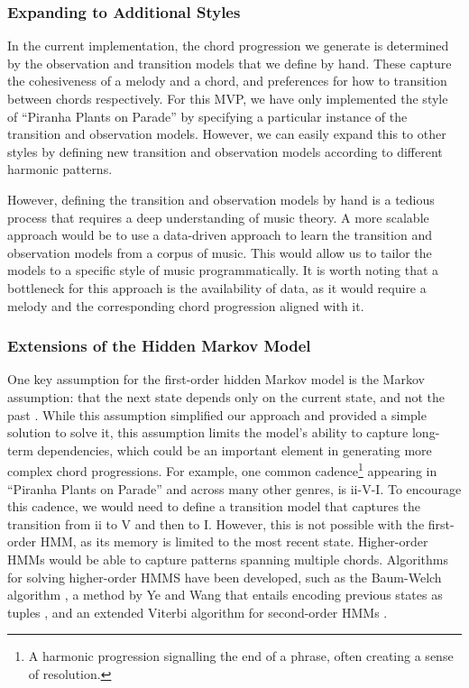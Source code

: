 \subsubsection{Expanding to Additional Styles}

In the current implementation, the chord progression we generate is determined by the observation and transition models that we define by hand. These capture the cohesiveness of a melody and a chord, and preferences for how to transition between chords respectively. For this MVP, we have only implemented the style of ``Piranha Plants on Parade'' by specifying a particular instance of the transition and observation models. However, we can easily expand this to other styles by defining new transition and observation models according to different harmonic patterns.

However, defining the transition and observation models by hand is a tedious process that requires a deep understanding of music theory. A more scalable approach would be to use a data-driven approach to learn the transition and observation models from a corpus of music. This would allow us to tailor the models to a specific style of music programmatically. It is worth noting that a bottleneck for this approach is the availability of data, as it would require a melody and the corresponding chord progression aligned with it.

\subsubsection{Extensions of the Hidden Markov Model}

One key assumption for the first-order hidden Markov model is the Markov assumption: that the next state depends only on the current state, and not the past \autocite{SpeechLang:2025}. While this assumption simplified our approach and provided a simple solution to solve it, this assumption limits the model's ability to capture long-term dependencies, which could be an important element in generating more complex chord progressions. For example, one common cadence\footnote{A harmonic progression signalling the end of a phrase, often creating a sense of resolution.} appearing in ``Piranha Plants on Parade'' and across many other genres, is ii-V-I. To encourage this cadence, we would need to define a transition model that captures the transition from ii to V and then to I. However, this is not possible with the first-order HMM, as its memory is limited to the most recent state. Higher-order HMMs would be able to capture patterns spanning multiple chords. Algorithms for solving higher-order HMMS have been developed, such as the Baum-Welch algorithm \autocite{BaumWelch:1970}, a method by Ye and Wang that entails encoding previous states as tuples \autocite{DecodeHMM:2014}, and an extended Viterbi algorithm for second-order HMMs \autocite{Viterbi2:1988}.

